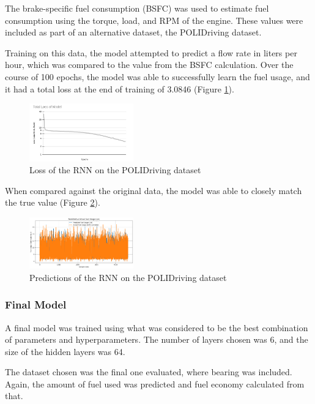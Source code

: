 \documentclass[letterpaper]{article}
\begin{document}
The brake-specific fuel consumption (BSFC) was used to estimate fuel 
consumption using the torque, load, and RPM of the engine. These values 
were included as part of an alternative dataset, the POLIDriving dataset.

Training on this data, the model attempted to predict a flow rate in liters 
per hour, which was compared to the value from the BSFC calculation. Over 
the course of 100 epochs, the model was able to successfully learn the fuel 
usage, and it had a total loss at the end of training of 3.0846 
(Figure \ref{fig:lossrnn}).

\begin{figure}[h!]
    \centering
    \includegraphics[width=0.4\textwidth]{figures/loss.jpg}
    \caption{Loss of the RNN on the POLIDriving dataset}
    \label{fig:lossrnn}
\end{figure}

When compared against the original data, the model was able to closely 
match the true value (Figure \ref{fig:predictionrnn}).\\

\begin{figure}[h!]
    \centering
    \includegraphics[width=0.4\textwidth]{figures/rnn_predictions.png}
    \caption{Predictions of the RNN on the POLIDriving dataset}
    \label{fig:predictionrnn}
\end{figure}

\subsubsection*{Final Model}

A final model was trained using what was considered to be the best 
combination of parameters and hyperparameters. The number of layers chosen 
was 6, and the size of the hidden layers was 64.

The dataset chosen was the final one evaluated, where bearing was 
included. Again, the amount of fuel used was predicted and fuel economy 
calculated from that.
\end{document}
